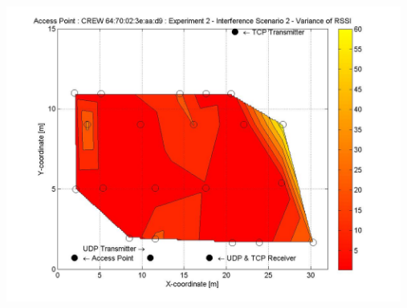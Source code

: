 \documentclass[11pt,a4paper,headinclude,footinclude,chapterprefix=on]{scrreprt}
\begin{document}
\begin{longtable}
	\includegraphics[width=13cm]{../../Source/plot/CREW_d9/d9_Wifi_Ex_2_Variance.jpg} \\
\end{longtable}
\end{document}
